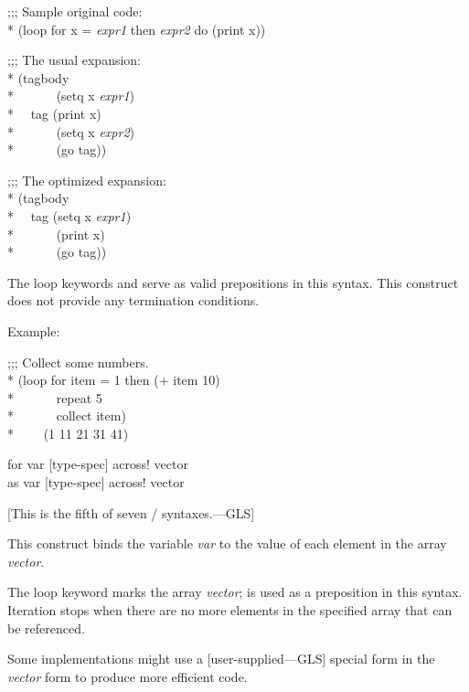 \begin{new}
\begin{defloop}
\begin{lisp}
;;; Sample original code: \\*
(loop for x = {\it expr1\/} then {\it expr2\/} do (print x))
\end{lisp}
\begin{lisp}
;;; The usual expansion: \\*
(tagbody \\*
~~~~~~(setq x {\it expr1\/}) \\*
~~tag (print x) \\*
~~~~~~(setq x {\it expr2\/}) \\*
~~~~~~(go tag))
\end{lisp}
\begin{lisp}
;;; The optimized expansion: \\*
(tagbody \\*
~~tag (setq x {\it expr1\/}) \\*
~~~~~~(print x) \\*
~~~~~~(go tag))
\end{lisp}

The loop keywords \cdf{=} and   serve as valid prepositions
in this syntax.
This construct does not provide any termination conditions.

Example:
\begin{lisp}
;;; Collect some numbers. \\*
(loop for item = 1 then (+ item 10) \\*
~~~~~~repeat 5 \\*
~~~~~~collect item) \\*
~~~\EV~(1 11 21 31 41)
\end{lisp}
\end{defloop}


\begin{defloop}
for var [type-spec] \!across! vector \\
as var [type-spec] \!across! vector

[This is the fifth of seven / syntaxes.---GLS]

    This construct binds the variable {\it var\/} to
    the value of each element in the array {\it vector}.

  The loop keyword  marks the array {\it vector}; 
  is used as a preposition in this syntax.
  Iteration stops when there are no more elements in the specified
  array that can be referenced.

  Some implementations might use a [user-supplied---GLS]  special form
  in the {\it vector} form to produce more efficient code.


\end{defloop}
\end{new}
